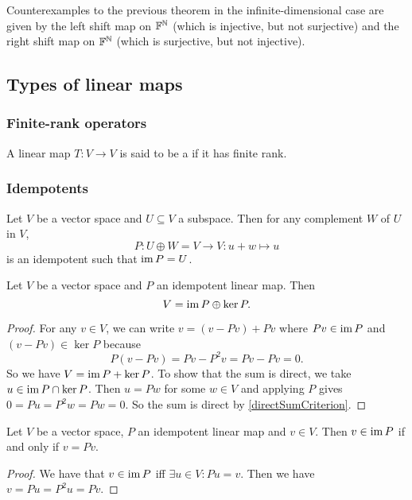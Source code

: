 \begin{example}
Counterexamples to the previous theorem in the infinite-dimensional case are given by the left shift map on $\mathbb{F}^{\mathbb{N}}$ (which is injective, but not surjective) and the right shift map on $\mathbb{F}^{\mathbb{N}}$ (which is surjective, but not injective).
\end{example}

\subsection{Types of linear maps}
\subsubsection{Finite-rank operators}
\begin{definition}
A linear map $T: V\to V$ is said to be a  if it has finite rank.
\end{definition}
\subsubsection{Idempotents}

\begin{lemma}
Let $V$ be a vector space and $U\subseteq V$ a subspace. Then for any complement $W$ of $U$ in $V$,
\[ P: U\oplus W = V \to V: u+w \mapsto u \]
is an idempotent such that $\operatorname{im} P = U$.
\end{lemma}

\begin{proposition} \label{directSumKernelImageIdempotent}
Let $V$ be a vector space and $P$ an idempotent linear map. Then
\[ V = \operatorname{im} P \oplus \ker P. \]
\end{proposition}
\begin{proof}
For any $v\in V$, we can write $v= (v-Pv)+Pv$ where $Pv\in \operatorname{im} P$ and $(v-Pv)\in \ker P$ because
\[ P(v-Pv) = Pv- P^2v = Pv - Pv = 0. \]
So we have $V = \operatorname{im} P + \ker P$. To show that the sum is direct, we take $u\in \operatorname{im} P \cap \ker P$. Then $u = Pw$ for some $w\in V$ and applying $P$ gives $0 = Pu = P^2w = Pw = 0$. So the sum is direct by \ref{directSumCriterion}.
\end{proof}

\begin{lemma} \label{idempotentImageEquivalence}
Let $V$ be a vector space, $P$ an idempotent linear map and $v\in V$. Then $v\in \operatorname{im} P$ \textup{if and only if} $v = Pv$.
\end{lemma}
\begin{proof}
We have that $v\in \operatorname{im} P$ iff $\exists u\in V: Pu = v$. Then we have $v = Pu = P^2u = Pv$.
\end{proof}

